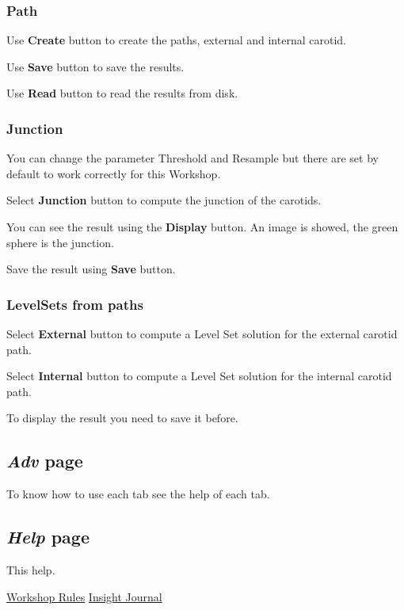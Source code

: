 \documentclass{article}
\begin{document}
\subsubsection{Path}
Use {\bf Create} button to create the paths, external and internal carotid.


Use {\bf Save} button to save the results.


Use {\bf Read} button to read the results from disk.
\subsubsection{Junction}
You can change the parameter Threshold and Resample but there are set by default to work correctly for this Workshop.


Select {\bf Junction} button to compute the junction of the carotids.


You can see the result using the {\bf Display} button. An image is showed, the green sphere is the junction.


Save the result using {\bf Save} button.
\subsubsection{LevelSets from paths}
Select {\bf External} button to compute a Level Set solution for the external carotid path.


Select {\bf Internal} button to compute a Level Set solution for the internal carotid path.


To display the result you need to save it before.

\subsection{\emph{Adv} page}
To know how to use each tab see the help of each tab.

\subsection{\emph{Help} page}
This help.

\begin{thebibliography}{1}
 \href{http://cls2009.bigr.nl/index.php}{Workshop Rules}
 \href{http://www.insight-journal.org/browse/publication/672}{Insight Journal}
\end{thebibliography}
\end{document}

